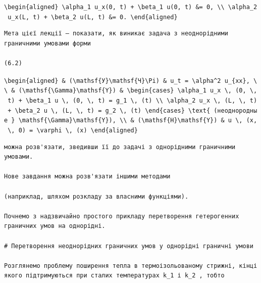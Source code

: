 \documentclass[
  ukrainian,
]{article}
\begin{document}
\texttt{\textbackslash{}begin\{aligned\}\ \textbackslash{}alpha\_1\ u\_x(0,\ t)\ +\ \textbackslash{}beta\_1\ u(0,\ t)\ \&=\ 0,\ \textbackslash{}\textbackslash{}\ \textbackslash{}alpha\_2\ u\_x(L,\ t)\ +\ \textbackslash{}beta\_2\ u(L,\ t)\ \&=\ 0.\ \textbackslash{}end\{aligned\}}

\begin{verbatim}
Мета цієї лекції — показати, як виникає задача з неоднорідними граничними умовами форми

(6.2)
\end{verbatim}

\texttt{\textbackslash{}begin\{aligned\}\ \&\ (\textbackslash{}mathsf\{У\}\textbackslash{}mathsf\{Ч\}\textbackslash{}Pi)\ \&\ u\_t\ =\ \textbackslash{}alpha\^{}2\ u\_\{xx\},\ \textbackslash{}\textbackslash{}\ \&\ (\textbackslash{}mathsf\{\textbackslash{}Gamma\}\textbackslash{}mathsf\{Y\})\ \&\ \textbackslash{}begin\{cases\}\ \textbackslash{}alpha\_1\ u\_x\ \textbackslash{},\ (0,\ \textbackslash{},\ t)\ +\ \textbackslash{}beta\_1\ u\ \textbackslash{},\ (0,\ \textbackslash{},\ t)\ =\ g\_1\ \textbackslash{},\ (t)\ \textbackslash{}\textbackslash{}\ \textbackslash{}alpha\_2\ u\_x\ \textbackslash{},\ (L,\ \textbackslash{},\ t)\ +\ \textbackslash{}beta\_2\ u\ \textbackslash{},\ (L,\ \textbackslash{},\ t)\ =\ g\_2\ \textbackslash{},\ (t)\ \textbackslash{}end\{cases\}\ \textbackslash{}text\{\ (неоднородные\ \}\ \textbackslash{}mathsf\{\textbackslash{}Gamma\}\textbackslash{}mathsf\{Y\}),\ \textbackslash{}\textbackslash{}\ \&\ (\textbackslash{}mathsf\{H\}\textbackslash{}mathsf\{Y\})\ \&\ u\ \textbackslash{},\ (x,\ \textbackslash{},\ 0)\ =\ \textbackslash{}varphi\ \textbackslash{},\ (x)\ \textbackslash{}end\{aligned\}}

\begin{verbatim}
можна розв'язати, зведивши її до задачі з однорідними граничними умовами.

Нове завдання можна розв'язати іншими методами

(наприклад, шляхом розкладу за власними функціями).

Почнемо з надзвичайно простого прикладу перетворення гетерогенних граничних умов на однорідні.

# Перетворення неоднорідних граничних умов у однорідні граничні умови

Розглянемо проблему поширення тепла в термоізольованому стрижні, кінці якого підтримуються при сталих температурах k_1 і k_2 , тобто
\end{verbatim}
\end{document}
